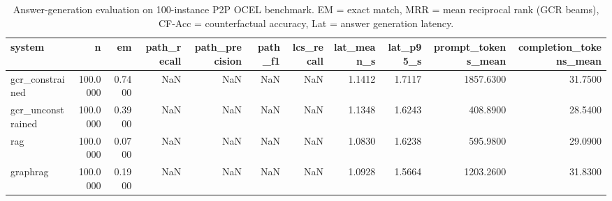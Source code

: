 \begin{table}
\caption{Answer-generation evaluation on 100-instance P2P OCEL benchmark. EM = exact match, MRR = mean reciprocal rank (GCR beams), CF-Acc = counterfactual accuracy, Lat = answer generation latency.}
\label{tab:answer_results}
\begin{tabular}{lrrrrrrrrrr}
\toprule
system & n & em & path_recall & path_precision & path_f1 & lcs_recall & lat_mean_s & lat_p95_s & prompt_tokens_mean & completion_tokens_mean \\
\midrule
gcr_constrained & 100.0000 & 0.7400 & NaN & NaN & NaN & NaN & 1.1412 & 1.7117 & 1857.6300 & 31.7500 \\
gcr_unconstrained & 100.0000 & 0.3900 & NaN & NaN & NaN & NaN & 1.1348 & 1.6243 & 408.8900 & 28.5400 \\
rag & 100.0000 & 0.0700 & NaN & NaN & NaN & NaN & 1.0830 & 1.6238 & 595.9800 & 29.0900 \\
graphrag & 100.0000 & 0.1900 & NaN & NaN & NaN & NaN & 1.0928 & 1.5664 & 1203.2600 & 31.8300 \\
\bottomrule
\end{tabular}
\end{table}
